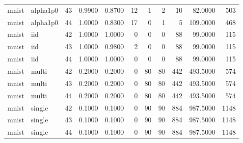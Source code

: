 \begin{tabular}{llrrrrrrrrr}
mnist & alpha1p0 & 43 & 0.9900 & 0.8700 & 12 & 1 & 2 & 10 & 82.0000 & 503 \\
mnist & alpha1p0 & 44 & 1.0000 & 0.8300 & 17 & 0 & 1 & 5 & 109.0000 & 468 \\
mnist & iid & 42 & 1.0000 & 1.0000 & 0 & 0 & 0 & 88 & 99.0000 & 115 \\
mnist & iid & 43 & 1.0000 & 0.9800 & 2 & 0 & 0 & 88 & 99.0000 & 115 \\
mnist & iid & 44 & 1.0000 & 1.0000 & 0 & 0 & 0 & 88 & 99.0000 & 115 \\
mnist & multi & 42 & 0.2000 & 0.2000 & 0 & 80 & 80 & 442 & 493.5000 & 574 \\
mnist & multi & 43 & 0.2000 & 0.2000 & 0 & 80 & 80 & 442 & 493.5000 & 574 \\
mnist & multi & 44 & 0.2000 & 0.2000 & 0 & 80 & 80 & 442 & 493.5000 & 574 \\
mnist & single & 42 & 0.1000 & 0.1000 & 0 & 90 & 90 & 884 & 987.5000 & 1148 \\
mnist & single & 43 & 0.1000 & 0.1000 & 0 & 90 & 90 & 884 & 987.5000 & 1148 \\
mnist & single & 44 & 0.1000 & 0.1000 & 0 & 90 & 90 & 884 & 987.5000 & 1148 \\
\bottomrule
\end{tabular}
